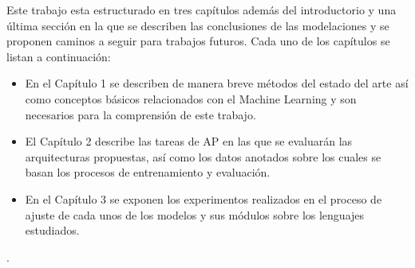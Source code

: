 Este trabajo esta estructurado en tres capítulos además del introductorio y una última sección en la que se describen las conclusiones de las modelaciones y se proponen  caminos a seguir para trabajos futuros. Cada uno de los capítulos se listan a continuación: 

\begin{itemize}
	\item En el Capítulo 1 se describen de manera breve métodos del estado del arte así como conceptos básicos relacionados con el Machine Learning y son necesarios para la comprensión de este trabajo.
	\item El Capítulo 2 describe las tareas de AP en las que se evaluarán las arquitecturas propuestas, así como los datos anotados sobre los cuales se basan los procesos de entrenamiento y evaluación.
	\item En el Capítulo 3 se exponen los experimentos realizados en el proceso de ajuste de cada unos de los modelos y sus módulos sobre los lenguajes estudiados. 
\end{itemize}
. 